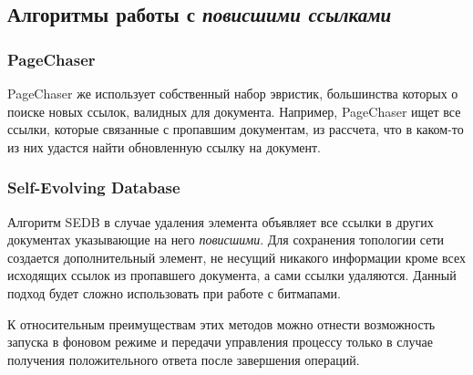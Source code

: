 \subsection{Алгоритмы работы с \textit{повисшими ссылками}}

\subsubsection{PageChaser}

PageChaser\cite{PageChaser:2009} же использует собственный набор эвристик, большинства
которых о поиске новых ссылок, валидных для документа. Например, PageChaser ищет все
ссылки, которые связанные с пропавшим документам, из рассчета, что в каком-то из них
удастся найти обновленную ссылку на документ.

\subsubsection{Self-Evolving Database}

Алгоритм SEDB\cite{SEDB:1998} в случае удаления элемента объявляет все ссылки в других
документах указывающие на него \textit{повисшими}. Для сохранения топологии сети
создается дополнительный элемент, не несущий никакого информации кроме всех исходящих
ссылок из пропавшего документа, а сами ссылки удаляются. Данный подход
будет сложно использовать при работе с битмапами.

К относительным преимуществам этих методов можно отнести возможность запуска в фоновом
режиме и передачи управления процессу только в случае получения положительного ответа 
после завершения операций.
